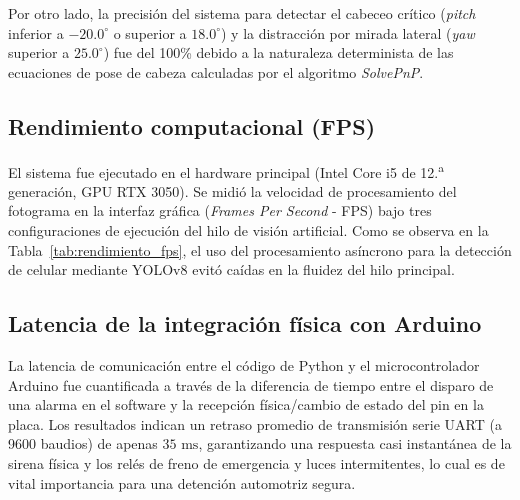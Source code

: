 \documentclass[conference]{IEEEtran}
\begin{document}
Por otro lado, la precisión del sistema para detectar el cabeceo crítico (\textit{pitch} inferior a $-20.0^\circ$ o superior a $18.0^\circ$) y la distracción por mirada lateral (\textit{yaw} superior a $25.0^\circ$) fue del 100\% debido a la naturaleza determinista de las ecuaciones de pose de cabeza calculadas por el algoritmo \textit{SolvePnP}.

\subsection{Rendimiento computacional (FPS)}

El sistema fue ejecutado en el hardware principal (Intel Core i5 de 12.\textsuperscript{a} generación, GPU RTX 3050). Se midió la velocidad de procesamiento del fotograma en la interfaz gráfica (\textit{Frames Per Second} - FPS) bajo tres configuraciones de ejecución del hilo de visión artificial. Como se observa en la Tabla~\ref{tab:rendimiento_fps}, el uso del procesamiento asíncrono para la detección de celular mediante YOLOv8 evitó caídas en la fluidez del hilo principal.

\begin{table}[htbp]
\caption{Rendimiento en FPS según la configuración activa}
\label{tab:rendimiento_fps}
\centering
{}
\end{table}

\subsection{Latencia de la integración física con Arduino}

La latencia de comunicación entre el código de Python y el microcontrolador Arduino fue cuantificada a través de la diferencia de tiempo entre el disparo de una alarma en el software y la recepción física/cambio de estado del pin en la placa. Los resultados indican un retraso promedio de transmisión serie UART (a 9600 baudios) de apenas $35\text{ ms}$, garantizando una respuesta casi instantánea de la sirena física y los relés de freno de emergencia y luces intermitentes, lo cual es de vital importancia para una detención automotriz segura.
\end{document}
